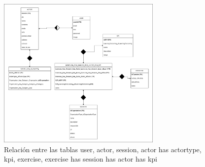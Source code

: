 \begin{figure}[H]
    \centering
    \includegraphics[width=8cm]{archivos/tfg_jorge/modelo_logico/exercises_kpi}
    \caption{Relación entre las tablas user, actor, session, actor has actortype, kpi, exercise, exercise has session has actor has kpi}\label{sistemass2}
\end{figure}
